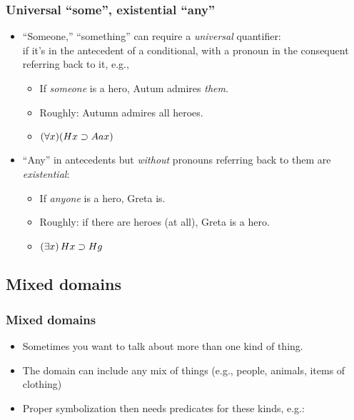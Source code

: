\begin{frame}
\frametitle{Universal ``some'', existential ``any''}

\begin{itemize}[<+->]
  \item ``Someone,'' ``something'' can require a \emph{universal} quantifier:\\
 if it's in the antecedent of a conditional, with a pronoun in the consequent referring back to it, e.g.,
  \begin{itemize}[<+->]
    \item[] If \emph{someone} is a hero, Autum admires \emph{them}.
    \item[] Roughly: Autumn admires all heroes.
    \item[] \alert{$(\forall x)(Hx \supset Aax)$}
  \end{itemize}
  \item ``Any'' in antecedents but \emph{without} pronouns referring back to
  them are \emph{existential}:
  \begin{itemize}[<+->]
    \item[] If \emph{anyone} is a hero, Greta is.
    \item[] Roughly: if there are heroes (at all), Greta is a hero.
    \item[] \alert{$(\exists x)\, Hx \supset Hg$}
  \end{itemize}
\end{itemize}
\end{frame}

\subsection{Mixed domains}

\begin{frame}
\frametitle{Mixed domains}

\begin{itemize}[<+->]
  \item Sometimes you want to talk about more than one kind of thing.
  \item The domain can include any mix of things (e.g., people,
  animals, items of clothing)
  \item Proper symbolization then needs predicates for these kinds, e.g.:
\end{itemize}
\end{frame}


